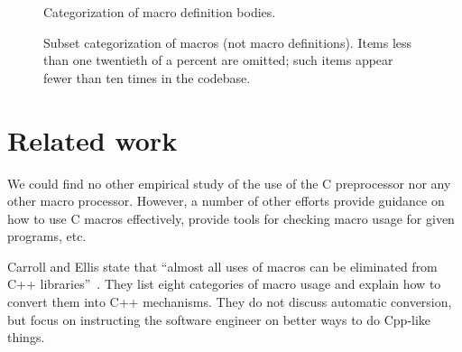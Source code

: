 \documentclass[11pt]{article}
\begin{document}


\begin{figure}
\centerline{}
\caption{Categorization of macro definition bodies.}
\label{fig:categorization}
\end{figure}







\begin{figure}
{\small\centerline{}}
\caption{Subset categorization of macros (not macro definitions).   Items
  less than one twentieth of a percent are omitted; such items appear
  fewer than ten times in the codebase.}
\label{fig:subset-categories}
\end{figure}
 



\section{Related work}
\label{sec:related}

We could find no other empirical study of the use of the C preprocessor nor
any other macro processor.  However, a number of other efforts provide
guidance on how to use C macros effectively, provide tools for checking
macro usage for given programs, etc.

Carroll and Ellis state that ``almost all uses of macros can be eliminated
from C++ libraries''~\cite[p.~146]{Carroll95}.  They list eight categories
of macro usage and explain how to convert them into C++ mechanisms.  They
do not discuss automatic conversion, but focus on instructing the software
engineer on better ways to do Cpp-like things.
\end{document}
